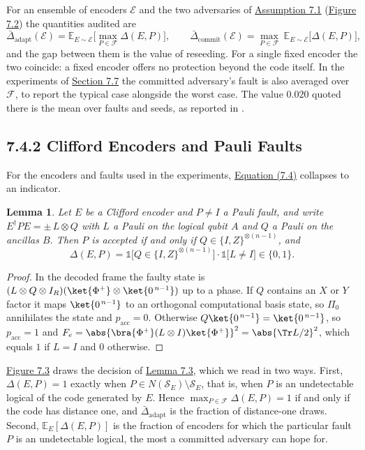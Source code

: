 \documentclass{report}
\theoremstyle{plain}
\newtheorem{lemma}[theorem]{Lemma}
\theoremstyle{definition}
\theoremstyle{remark}
\begin{document}
For an ensemble of encoders $\mathcal{E}$ and the two adversaries of \hyperref[ass:qec:model]{Assumption 7.1} (\hyperref[fig:qec:adversaries]{Figure 7.2}) the quantities audited are
\hypertarget{eq:qec:adversaries}{}\[
  \bar\Delta_{\mathrm{adapt}}(\mathcal{E})=\mathbb{E}_{E\sim\mathcal{E}}\Big[\max_{P\in\mathcal{F}}\Delta(E,P)\Big],\qquad
  \bar\Delta_{\mathrm{commit}}(\mathcal{E})=\max_{P\in\mathcal{F}}\ \mathbb{E}_{E\sim\mathcal{E}}\big[\Delta(E,P)\big],
\tag{7.5}\]
and the gap between them is the value of reseeding. For a single fixed encoder the two coincide: a fixed encoder offers no protection beyond the code itself. In the experiments of \hyperref[sec:qec:experiments]{Section 7.7} the committed adversary's fault is also averaged over $\mathcal{F}$, to report the typical case alongside the worst case. The value $0.020$ quoted there is the mean over faults and seeds, as reported in \cite{guo2026qecaudit}.

\subsection{7.4.2 Clifford Encoders and Pauli Faults}\label{sec:qec:cliffordcase}

For the encoders and faults used in the experiments, \hyperref[eq:qec:disturbance]{Equation (7.4)} collapses to an indicator.

\begin{lemma}\label{lem:qec:indicator}
Let $E$ be a Clifford encoder and $P\neq I$ a Pauli fault, and write $E^{\dagger}PE=\pm\,L\otimes Q$ with $L$ a Pauli on the logical qubit $A$ and $Q$ a Pauli on the ancillas $B$. Then $P$ is accepted if and only if $Q\in\{I,Z\}^{\otimes(n-1)}$, and
\hypertarget{eq:qec:indicator}{}\[
  \Delta(E,P)=\mathbb{1}\big[Q\in\{I,Z\}^{\otimes(n-1)}\big]\cdot\mathbb{1}\big[L\neq I\big]\in\{0,1\}.
\tag{7.6}\]
\end{lemma}
\begin{proof}
In the decoded frame the faulty state is $(L\otimes Q\otimes I_R)(\ket{\Phi^{+}}\otimes\ket{0^{\,n-1}})$ up to a phase. If $Q$ contains an $X$ or $Y$ factor it maps $\ket{0^{\,n-1}}$ to an orthogonal computational basis state, so $\Pi_0$ annihilates the state and $p_{\mathrm{acc}}=0$. Otherwise $Q\ket{0^{\,n-1}}=\ket{0^{\,n-1}}$, so $p_{\mathrm{acc}}=1$ and $F_e=\abs{\bra{\Phi^{+}}(L\otimes I)\ket{\Phi^{+}}}^{2}=\abs{\Tr L/2}^{2}$, which equals $1$ if $L=I$ and $0$ otherwise.
\end{proof}

\hyperref[fig:qec:indicator]{Figure 7.3} draws the decision of \hyperref[lem:qec:indicator]{Lemma 7.3}, which we read in two ways. First, $\Delta(E,P)=1$ exactly when $P\in N(\mathcal{S}_E)\setminus\mathcal{S}_E$, that is, when $P$ is an undetectable logical of the code generated by $E$. Hence $\max_{P\in\mathcal{F}}\Delta(E,P)=1$ if and only if the code has distance one, and $\bar\Delta_{\mathrm{adapt}}$ is the fraction of distance-one draws. Second, $\mathbb{E}_E[\Delta(E,P)]$ is the fraction of encoders for which the particular fault $P$ is an undetectable logical, the most a committed adversary can hope for.
\end{document}
